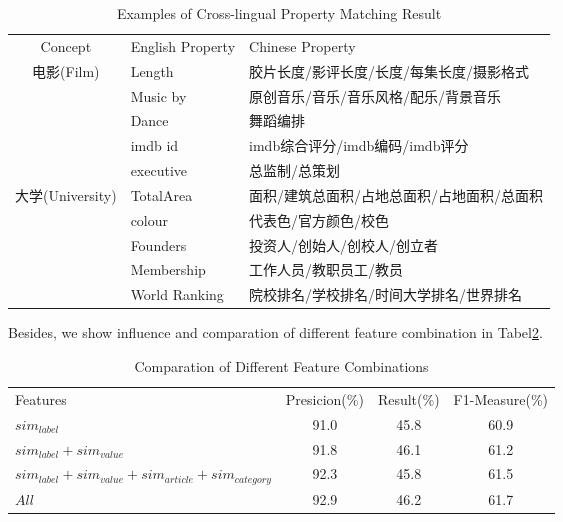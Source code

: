 \documentclass[runningheads,a4paper]{llncs}
\begin{document}
\begin{table}[htb]
  \centering
  \caption{Examples of Cross-lingual Property Matching Result}
  \label{tab:property-matching-examples}
    \begin{tabular}{cll}
      {Concept} & {English Property} & {Chinese Property} \\
      \multirow{5}{*}{电影(Film)}
      & Length        & 胶片长度/影评长度/长度/每集长度/摄影格式  \\
      & Music by      & 原创音乐/音乐/音乐风格/配乐/背景音乐      \\
      & Dance         & 舞蹈编排                                  \\
      & imdb id       & imdb综合评分/imdb编码/imdb评分            \\
      & executive     & 总监制/总策划                             \\
      \multirow{5}{*}{大学(University)}
      & TotalArea      & 面积/建筑总面积/占地总面积/占地面积/总面积  \\
      & colour         & 代表色/官方颜色/校色                  \\
      & Founders       & 投资人/创始人/创校人/创立者           \\
      & Membership     & 工作人员/教职员工/教员                \\
      & World Ranking  & 院校排名/学校排名/时间大学排名/世界排名     \\
    \end{tabular}
\end{table}

Besides, we show influence and comparation of different feature combination in Tabel\ref{tab:feature-compare}.

\begin{table}[htb]
  \centering
  \caption{Comparation of Different Feature Combinations}
  \label{tab:feature-compare}
    \begin{tabular}{lccc}
      {Features} & {Presicion(\%)} &  {Result(\%)} & {F1-Measure(\%)}  \\
       $sim_{label}$& 91.0       & 45.8 & 60.9 \\
       $sim_{label}+sim_{value}$ & 91.8 & 46.1 & 61.2  \\
       $sim_{label}+sim_{value}+sim_{article}+sim_{category}$ & 92.3 & 45.8 & 61.5  \\
       $All$ & 92.9 & 46.2 & 61.7 \\
    \end{tabular}
\end{table}
\end{document}
